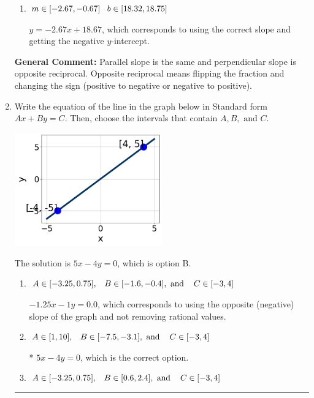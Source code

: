 \documentclass{extbook}[14pt]
\newcommand{\litem}[1]{\item #1

\rule{\textwidth}{0.4pt}}
\begin{document}
\begin{enumerate}
{\begin{enumerate}[label=\Alph*.]
 $y = -2.67x + 18.00$, which corresponds to correct slope and mis-distributing while simplifying to slope-intercept form.
\item \( m \in [-2.67, -0.67] \hspace*{3mm} b \in [18.32, 18.75] \)

 $y = -2.67x + 18.67$, which corresponds to using the correct slope and getting the negative $y$-intercept.
\end{enumerate}

\textbf{General Comment:} Parallel slope is the same and perpendicular slope is opposite reciprocal. Opposite reciprocal means flipping the fraction and changing the sign (positive to negative or negative to positive).
}
\litem{
Write the equation of the line in the graph below in Standard form $Ax+By=C$. Then, choose the intervals that contain $A, B, \text{ and } C$.

\begin{center}
    \includegraphics[width=0.5\textwidth]{../Figures/linearGraphToStandardCopyC.png}
\end{center}


The solution is \( 5x - 4y = 0 \), which is option B.\begin{enumerate}[label=\Alph*.]
\item \( A \in [-3.25, 0.75], \hspace{3mm} B \in [-1.6, -0.4], \text{ and } \hspace{3mm} C \in [-3, 4] \)

 $-1.25x - 1y = 0.0$, which corresponds to using the opposite (negative) slope of the graph and not removing rational values.
\item \( A \in [1, 10], \hspace{3mm} B \in [-7.5, -3.1], \text{ and } \hspace{3mm} C \in [-3, 4] \)

* $5x - 4y = 0$, which is the correct option.
\item \( A \in [-3.25, 0.75], \hspace{3mm} B \in [0.6, 2.4], \text{ and } \hspace{3mm} C \in [-3, 4] \)


\end{enumerate}}
\end{enumerate}
\end{document}
